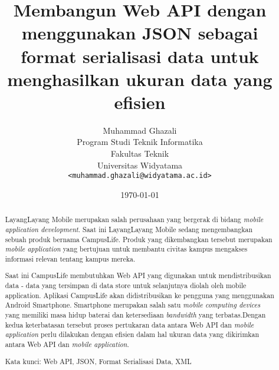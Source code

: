 \documentclass[a4paper, 12pt]{report}
\title{\textbf{Membangun Web API dengan menggunakan JSON sebagai format serialisasi data untuk menghasilkan ukuran data yang efisien}}
\author{
Muhammad Ghazali\\
Program Studi Teknik Informatika\\
Fakultas Teknik\\
Universitas Widyatama
\\\texttt{<muhammad.ghazali@widyatama.ac.id>}
}
\date{\today}
\begin{document}
\maketitle

\onehalfspacing
\tableofcontents
\setcounter{tocdepth}{3}

\begin{abstract}
\onehalfspacing LayangLayang Mobile merupakan salah perusahaan yang bergerak di bidang \textit{mobile application development}. Saat ini LayangLayang Mobile sedang mengembangkan sebuah produk bernama CampusLife. Produk yang dikembangkan tersebut merupakan \textit{mobile application} yang bertujuan untuk membantu civitas kampus mengakses informasi relevan tentang kampus mereka.

\onehalfspacing Saat ini CampusLife membutuhkan Web API yang digunakan untuk mendistribusikan data - data yang tersimpan di data store untuk selanjutnya diolah oleh mobile application. Aplikasi CampusLife akan didistribusikan ke pengguna yang menggunakan Android Smartphone. {Smartphone} merupakan salah satu \textit{mobile computing devices} yang memiliki masa hidup baterai dan ketersediaan \textit{bandwidth} yang terbatas.Dengan kedua keterbatasan tersebut proses pertukaran data antara Web API dan \textit{mobile application} perlu dilakukan dengan efisien dalam hal ukuran data yang dikirimkan antara Web API dan \textit{mobile application}.

\begin{flushleft}
\onehalfspacing Kata kunci: Web API, JSON, Format Serialisasi Data, XML
\end{flushleft}

\end{abstract}

\end{document}
